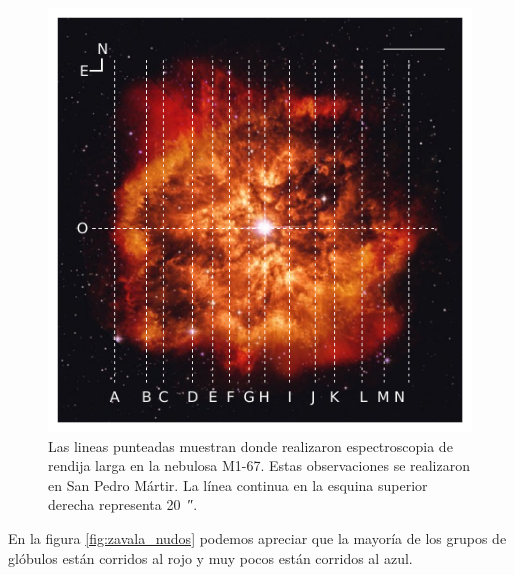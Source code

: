 \documentclass{book}
\begin{document}
\begin{figure}[htb]
    \centering
    \includegraphics[width=\textwidth]{Nuevas imagenes finales/rendijas_zavala.pdf}
    \caption{Las lineas punteadas muestran donde \cite{Zavala:2022} realizaron espectroscopia de rendija larga en la nebulosa M1-67. Estas observaciones se realizaron en San Pedro Mártir. La línea continua en la esquina superior derecha representa \SI{20}{\arcsecond}.}
    \label{fig:zavala_rendijas_nebula}
\end{figure}

En la figura \ref{fig:zavala_nudos} podemos apreciar que la mayoría de los grupos de glóbulos están corridos al rojo y muy pocos están corridos al azul.
\end{document}
